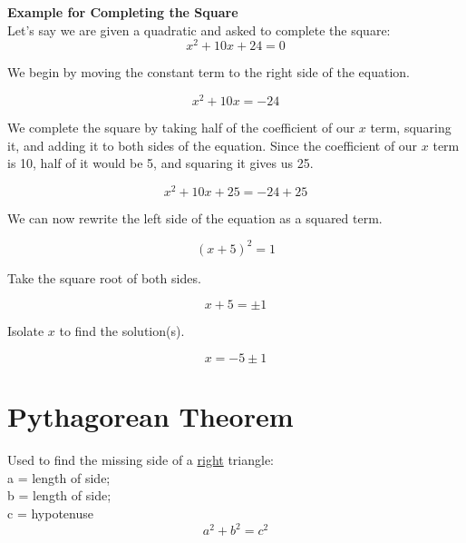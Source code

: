 \begin{framed}
  \noindent \textbf{Example for Completing the Square}\\
  Let's say we are given a quadratic and asked to complete the square:
  \begin{equation*}
    x^2 + 10x + 24 = 0
  \end{equation*}

  \noindent We begin by moving the constant term to the right side of the 
  equation.

  \begin{equation*}
    x^2 + 10x = -24
  \end{equation*}

  \noindent We complete the square by taking half of the coefficient of our $x$
  term, squaring it, and adding it to both sides of the equation. Since the
  coefficient of our $x$ term is 10, half of it would be 5, and squaring it 
  gives us 25.

  \begin{equation*}
    x^2 + 10x + 25 = -24 + 25
  \end{equation*}

  \noindent We can now rewrite the left side of the equation as a squared term.

  \begin{equation*}
    (x+5)^2 = 1
  \end{equation*}

  \noindent Take the square root of both sides.

  \begin{equation*}
    x+5 = \pm 1
  \end{equation*}

  \noindent Isolate $x$ to find the solution(s).

  \begin{equation*}
    x = -5 \pm 1
  \end{equation*}
\end{framed}

\newpage

\section{Pythagorean Theorem}

\noindent Used to find the missing side of a \underline{right} triangle:\\
a = length of side;\\
b = length of side;\\
c = hypotenuse
\begin{equation*}
  a^2+b^2=c^2
\end{equation*}

